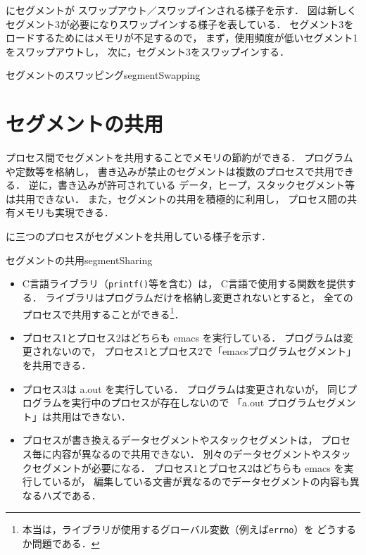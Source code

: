 にセグメントが
スワップアウト／スワップインされる様子を示す．
図は新しくセグメント3が必要になりスワップインする様子を表している．
セグメント3をロードするためにはメモリが不足するので，
まず，使用頻度が低いセグメント1をスワップアウトし，
次に，セグメント3をスワップインする．

{セグメントのスワッピング}{segmentSwapping}

\section{セグメントの共用}
プロセス間でセグメントを共用することでメモリの節約ができる．
プログラムや定数等を格納し，
書き込みが禁止のセグメントは複数のプロセスで共用できる．
逆に，書き込みが許可されている
データ，ヒープ，スタックセグメント等は共用できない．
また，セグメントの共用を積極的に利用し，
プロセス間の共有メモリも実現できる．

に三つのプロセスがセグメントを共用している様子を示す．

{セグメントの共用}{segmentSharing}

\begin{itemize}
\item C言語ライブラリ（\texttt{printf()}等を含む）は，
C言語で使用する関数を提供する．
ライブラリはプログラムだけを格納し変更されないとすると，
全てのプロセスで共用することができる\footnote{
本当は，ライブラリが使用するグローバル変数（例えば\texttt{errno}）を
どうするか問題である．
}．

\item プロセス1とプロセス2はどちらも emacs を実行している．
プログラムは変更されないので，
プロセス1とプロセス2で「emacsプログラムセグメント」を共用できる．

\item プロセス3は a.out を実行している．
プログラムは変更されないが，
同じプログラムを実行中のプロセスが存在しないので
「a.out プログラムセグメント」は共用はできない．

\item プロセスが書き換えるデータセグメントやスタックセグメントは，
プロセス毎に内容が異なるので共用できない．
別々のデータセグメントやスタックセグメントが必要になる．
プロセス1とプロセス2はどちらも emacs を実行しているが，
編集している文書が異なるのでデータセグメントの内容も異なるハズである．
\end{itemize}

